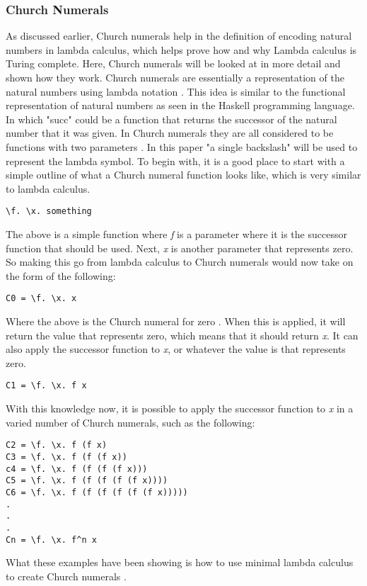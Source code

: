 \documentclass{article}
\begin{document}
\subsubsection{Church Numerals}
As discussed earlier, Church numerals help in the definition of encoding natural numbers in lambda calculus, which helps prove how and why Lambda calculus is Turing complete. 
Here, Church numerals will be looked at in  more detail and shown how they work.
Church numerals are essentially a representation of the natural numbers using lambda notation \cite{12}.
This idea is similar to the functional representation of natural numbers as seen in the Haskell programming language.
In which "succ" could be a function that returns the successor of the natural number that it was given.
In Church numerals they are all considered to be functions with two parameters \cite{13}.
In this paper "a single backslash" will be used to represent the lambda symbol.
To begin with, it is a good place to start with a simple outline of what a Church numeral function looks like, which is very similar to lambda calculus.
\begin{lstlisting}
\f. \x. something
\end{lstlisting}
The above is a simple function where \textit{f} is a parameter where it is the successor function that should be used. Next, \textit{x} is another parameter that represents zero.
So making this go from lambda calculus to Church numerals would now take on the form of the following:
\begin{lstlisting}
C0 = \f. \x. x
\end{lstlisting}
Where the above is the Church numeral for zero \cite{13}.
When this is applied, it will return the value that represents zero, which means that it should return \textit{x}. It can also apply the successor function to \textit{x}, or whatever the value is that represents zero.
\begin{lstlisting}
C1 = \f. \x. f x
\end{lstlisting}
With this knowledge now, it is possible to apply the successor function to \textit{x} in a varied number of Church numerals, such as the following:
\begin{lstlisting}
C2 = \f. \x. f (f x)
C3 = \f. \x. f (f (f x))
c4 = \f. \x. f (f (f (f x)))
C5 = \f. \x. f (f (f (f (f x))))
C6 = \f. \x. f (f (f (f (f (f x)))))
.
.
.
Cn = \f. \x. f^n x
\end{lstlisting}
What these examples have been showing is how to use minimal lambda calculus to create Church numerals \cite{13}.
\end{document}

